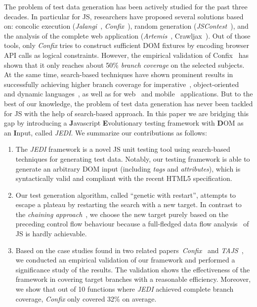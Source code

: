 The problem of test data generation has been actively studied for the past three decades. In particular for JS, researchers have proposed several solutions based on: concolic execution (\emph{Jalangi}~\cite{sen2013jalangi}, \emph{Confix}~\cite{amin:ase15}), random generation (\mbox{\emph{JSContest}}~\cite{heidegger2010contract}), and the analysis of the complete web application (\emph{Artemis}~\cite{artemis2011}, Crawljax~\cite{mesbah2012crawling}). Out of those tools, only \emph{Confix} tries to construct sufficient DOM fixtures by encoding browser API calls as logical constraints. However, the empirical validation of Confix~\cite{amin:ase15} has shown that it only reaches about 50\% \emph{branch coverage} on the selected subjects. At the same time, search-based techniques have shown prominent results in successfully achieving higher branch coverage for imperative~\cite{wegener2001evolutionary}, object-oriented~\cite{fraser2011evosuite} and dynamic languages~\cite{irawan2016test, wibowo2015unit}, as well as for web~\cite{alshahwan2011automated} and mobile~\cite{mao2016sapienz} applications. But to the best of our knowledge, the problem of test data generation has never been tackled for JS with the help of search-based approach. In this paper we are bridging this gap by introducing a \textbf{J}avascript \textbf{E}volutionary testing framework with \textbf{D}OM as an \textbf{I}nput, called \emph{JEDI}. We summarize our contributions as follows:
\begin{enumerate}[leftmargin=5mm]
\item The \emph{JEDI} framework is a novel JS unit testing tool using search-based techniques for generating test data. Notably, our testing framework is able to generate an arbitrary DOM input (including \emph{tags} and \emph{attributes}), which is syntactically valid and compliant with the recent HTML5 specification.
\item Our test generation algorithm, called ``genetic with restart'', attempts to escape a plateau by restarting the search with a new target. In contrast to the \emph{chaining approach}~\cite{ferguson1996chaining}, we choose the new target purely based on the preceding control flow behaviour because a full-fledged data flow analysis~\cite{jang2009points} of JS is hardly achievable.
\item Based on the case studies found in two related papers~\emph{Confix}~\cite{amin:ase15} and \emph{TAJS}~\cite{dom2011}, we conducted an empirical validation of our framework and performed a significance study of the results. The validation shows the effectiveness of the framework in covering target branches with a reasonable efficiency. Moreover, we show that out of 10 functions where \emph{JEDI} achieved complete branch coverage, \emph{Confix} only covered 32\% on average.
\end{enumerate}


